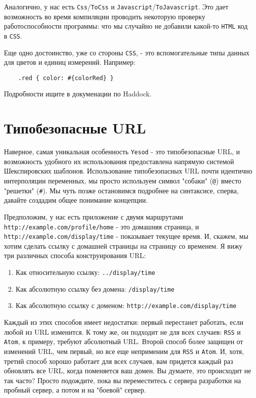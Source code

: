 Аналогично, у нас есть \lstinline!Css!/\lstinline!ToCss! и
\lstinline!Javascript!/\lstinline!ToJavascript!. Это дает возможность во время
компиляции проводить некоторую проверку работоспособности программы: что мы
случайно не добавили какой-то \texttt{HTML} код в \texttt{CSS}.

\begin{remark}
    Еще одно достоинство, уже со стороны \texttt{CSS}, - это вспомогательные
    типы данных для цветов и единиц измерений. Например:

    \begin{lstlisting}
    .red { color: #{colorRed} }
    \end{lstlisting}

    Подробности ищите в докуменации по Haddock.
\end{remark}

\section{Типобезопасные URL} Наверное, самая уникальная особенность
\texttt{Yesod} - это типобезопасные URL, и возможность удобного их
использования предоставлена напрямую системой Шекспировских шаблонов.
Использование типобезопасных URL почти идентично интерполяции переменных, мы
просто используем символ "собаки" (\verb'@') вместо "решетки" (\verb'#').  Мы
чуть позже остановимся подробнее на синтаксисе, сперва, давайте создадим общее
понимание концепции.

Предположим, у нас есть приложение с двумя маршрутами
\texttt{http://example.com/profile/home} - это домашняя страница, и
\texttt{http://example.com/display/time} - показывает текущее время.  И,
скажем, мы хотим сделать ссылку с домашней страницы на страницу со временем.  Я
вижу три различных способа конструирования URL:

\begin{enumerate}
  \item Как относительную ссылку: \texttt{../display/time}
  \item Как абсолютную ссылку без домена: \texttt{/display/time}
  \item Как абсолютную ссылку с доменом:
      \texttt{http://example.com/display/time}
\end{enumerate}

Каждый из этих способов имеет недостатки: первый перестанет работать, если
любой из URL изменится. К тому же, он подходит не для всех случаев:
\texttt{RSS} и \texttt{Atom}, к примеру, требуют абсолютный URL. Второй способ
более защищен от изменений URL, чем первый, но все еще неприменим для
\texttt{RSS} и \texttt{Atom}.  И, хотя, третий способ хорошо работает для всех
случаев, вам придется каждый раз обновлять все URL, когда поменяется ваш домен.
Вы думаете, это происходит не так часто? Просто подождите, пока вы
переместитесь с сервера разработки на пробный сервер, а потом и на "боевой"
сервер.

